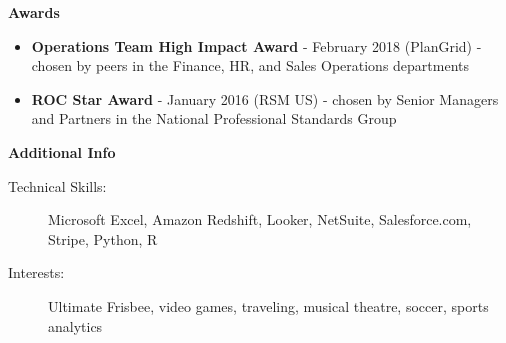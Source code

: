 \documentclass[10pt]{article}
\begin{document}
  {\large \textbf{Awards}}
  \begin{itemize}
    \item  \textbf{Operations Team High Impact Award} - February 2018 (PlanGrid) - chosen by peers in the Finance, HR, and Sales Operations departments
    \item \textbf{ROC Star Award} - January 2016 (RSM US) - chosen by Senior Managers and Partners in the National Professional Standards Group
  \end{itemize}

  {\large \textbf{Additional Info}}

  \begin{description}

    \item[Technical Skills:]
Microsoft Excel, Amazon Redshift, Looker, NetSuite, Salesforce.com, Stripe, Python, R

    \item[Interests:]
Ultimate Frisbee, video games, traveling, musical theatre, soccer, sports analytics

  \end{description}
\end{document}
